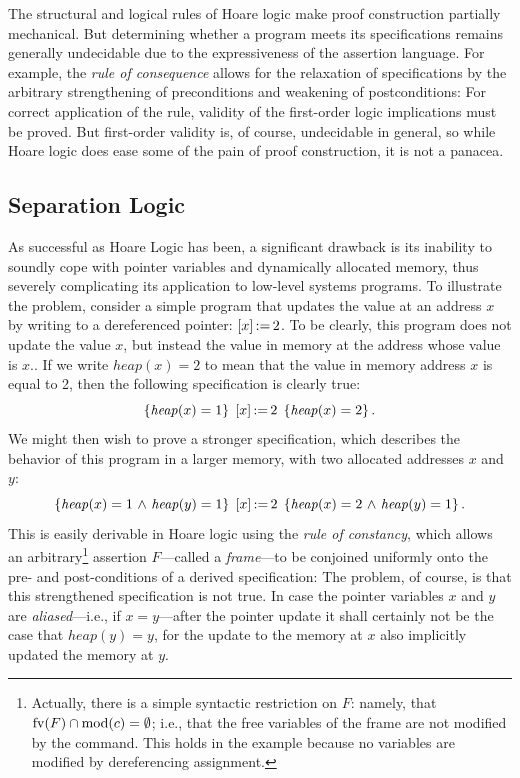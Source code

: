 \documentclass[11pt]{report}
\begin{document}
The structural and logical rules of Hoare logic make proof construction partially mechanical. But determining whether a program meets its specifications remains generally undecidable due to the expressiveness of the assertion language. For example, the \emph{rule of consequence} allows for the relaxation of specifications by the arbitrary strengthening of preconditions and weakening of postconditions:  For correct application of the rule, validity of the first-order logic implications must be proved. But first-order validity is, of course, undecidable in general, so while Hoare logic does ease some of the pain of proof construction, it is not a panacea.


\subsection{Separation Logic}
\label{sec:separation-logic}

As successful as Hoare Logic has been, a significant drawback is its inability to soundly cope with pointer variables and dynamically allocated memory, thus severely complicating its application to low-level systems programs. To illustrate the problem, consider a simple program that updates the value at an address $x$ by writing to a dereferenced pointer: $\left[ x \right] \operatorname{:\!=} 2$. To be clearly, this program does not update the value $x$, but instead the value in memory at the address whose value is $x.$. If we write $\mathit{heap}(x) = 2$ to mean that the value in memory address $x$ is equal to 2, then the following specification is clearly true: \[ \left\lbrace \mathit{heap}(x) = 1 \right\rbrace\;\left[ x \right] \operatorname{:\!=} 2\;\left\lbrace \mathit{heap}(x)=2 \right\rbrace.\] We might then wish to prove a stronger specification, which describes the behavior of this program in a larger memory, with two allocated addresses $x$ and $y$: \[ \left\lbrace \mathit{heap}(x) = 1 \operatorname{\,\wedge\,} \mathit{heap}(y) = 1 \right\rbrace\;\left[ x \right] \operatorname{:\!=} 2\;\left\lbrace \mathit{heap}(x)=2 \operatorname{\,\wedge\,} \mathit{heap}(y) = 1 \right\rbrace. \] This is easily derivable in Hoare logic using the \emph{rule of constancy}, which allows an arbitrary\footnote{Actually, there is a simple syntactic restriction on $F$: namely, that $\mathrm{fv}(F) \cap \mathrm{mod}(c) = \operatorname{\emptyset}$; i.e., that the free variables of the frame are not modified by the command. This holds in the example because no variables are modified by dereferencing assignment.} assertion $F$---called a \emph{frame}---to be conjoined uniformly onto the pre- and post-conditions of a derived specification:  The problem, of course, is that this strengthened specification is not true. In case the pointer variables $x$ and $y$ are \emph{aliased}---i.e., if $x = y$---after the pointer update it shall certainly not be the case that $\mathit{heap}(y) = y$, for the update to the memory at $x$ also implicitly updated the memory at $y$. 
\end{document}
